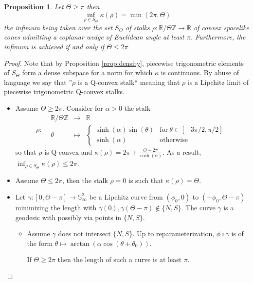\documentclass[a4paper,12pt]{article}
\def\ZZ{\mathbb{Z}}
\def\RR{\mathbb{R}}
\def\SS{\mathbb{S}}
\newcommand{\function}[5]{\displaystyle#1:\begin{array}{l|rcl}
& \displaystyle #2 & \longrightarrow & \displaystyle #3 \\
	& \displaystyle #4 & \longmapsto & \displaystyle #5 \end{array}}
\newtheorem{prop}[lem]{Proposition}
\theoremstyle{definition}
\begin{document}
					\begin{prop}\label{prop:volkov_lorentz_case_bigger_than_2pi} Let $\Theta\geq\pi$ then 
					$$\inf_{\rho\in S_\Theta}\kappa(\rho) = \min(2\pi,\Theta)$$ the infimum being taken over the set $S_\Theta$ of  stalks $\rho:\RR/\Theta\ZZ\rightarrow \RR$ of convex spacelike cones admitting a coplanar wedge of Euclidean angle at least $\pi$.
					Furthermore, the infimum is achieved if and only if $\Theta\leq 2\pi$

					\end{prop}
					\begin{proof} Note that by Proposition \ref{prop:density}, piecewise trigonometric elements of $S_\Theta$  form a dense subspace for a norm for which $\kappa$ is continuous. By abuse of language we say that ''$\rho$ is a Q-convex stalk`` meaning that $\rho$ is a Lipchitz limit of piecewise trigonometric Q-convex stalks.
					\begin{itemize}
					 \item Assume $\Theta\geq2\pi$. Consider for $\alpha>0$ the stalk $$\function{\rho}{\RR/\Theta\ZZ}{\RR}{\theta}{\left\lbrace \begin{array}{ll}
																			\sinh(\alpha) \sin(\theta) & \mathrm{for }~ \theta \in [-3\pi/2,\pi/2] \\
												\sinh(\alpha)	& \mathrm{otherwise}
																		\end{array}\right.
					} $$
				so that $\rho$ is Q-convex and $\kappa(\rho)=2\pi+\frac{\Theta-2\pi}{\cosh(\alpha)}$. As a result, $\inf_{\rho\in S_\Theta} \kappa(\rho)\leq 2\pi.$
				
				\item Assume $\Theta\leq 2\pi$, then the stalk $\rho=0$ is such that $\kappa(\rho)=\Theta$.
				
				\item Let $\gamma: [0,\Theta-\pi]\rightarrow \SS^2_\infty$ be a Lipchitz curve from $(\phi_0,0)$ to $(-\phi_0,\Theta-\pi)$ minimizing the length with $\gamma(0),\gamma(\Theta-\pi) \notin \{N, S\}$. 
				The curve $\gamma$ is a geodesic with possibly via points in $\{N, S\}$.
				
				\begin{itemize}
				 \item Assume $\gamma$ does not intersect $\{N,S\}$.  
				 Up to reparameterization, $\phi\circ \gamma$ is of the form $\theta\mapsto\arctan(\alpha\cos(\theta+\theta_0))$. 
				 
				 If $\Theta\geq2\pi$ then the length of such a curve is at least $\pi$.
				 

\end{itemize}
\end{itemize}
\end{proof}
\end{document}
